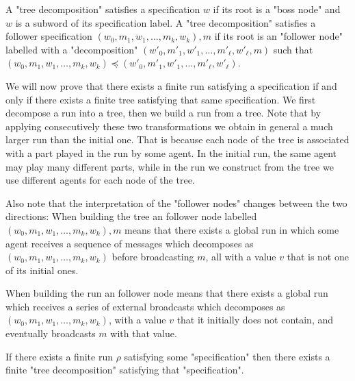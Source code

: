 \begin{definition}
	A "tree decomposition" satisfies a specification $w$ if its root is a "boss node" and $w$ is a subword of its specification label.
	A "tree decomposition" satisfies a follower specification $(w_0, m_1, w_1, \ldots, m_k, w_k) ,m$ if its root is an "follower node" labelled with a "decomposition" $(w'_0, m'_1, w'_1, \ldots, m'_\ell, w'_\ell,m)$ such that  $(w_0, m_1, w_1, \ldots, m_k, w_k) \preceq (w'_0, m'_1, w'_1, \ldots, m'_\ell, w'_\ell)$.
\end{definition}

We will now prove that there exists a finite run satisfying a specification if and only if there exists a finite tree satisfying that same specification.
We first decompose a run into a tree, then we build a run from a tree. Note that by applying consecutively these two transformations we obtain in general a much larger run than the initial one. That is because each node of the tree is associated with a part played in the run by some agent. In the initial run, the same agent may play many different parts, while in the run we construct from the tree we use different agents for each node of the tree.

Also note that the interpretation of the "follower nodes" changes between the two directions: When building the tree an follower node labelled $(w_0, m_1, w_1, \ldots, m_k, w_k) ,m$ means that there exists a global run in which some agent receives a sequence of messages which decomposes as  $(w_0, m_1, w_1, \ldots, m_k, w_k)$ before broadcasting $m$, all with a value $v$ that is not one of its initial ones.

When building the run an follower node means that there exists a global run which receives a series of external broadcasts which decomposes as $(w_0, m_1, w_1, \ldots, m_k, w_k)$, with a value $v$ that it initially does not contain, and eventually broadcasts $m$ with that value.

\begin{lemma}
	If there exists a finite run $\rho$ satisfying some "specification" then there exists a finite "tree decomposition" satisfying that "specification".
\end{lemma}

